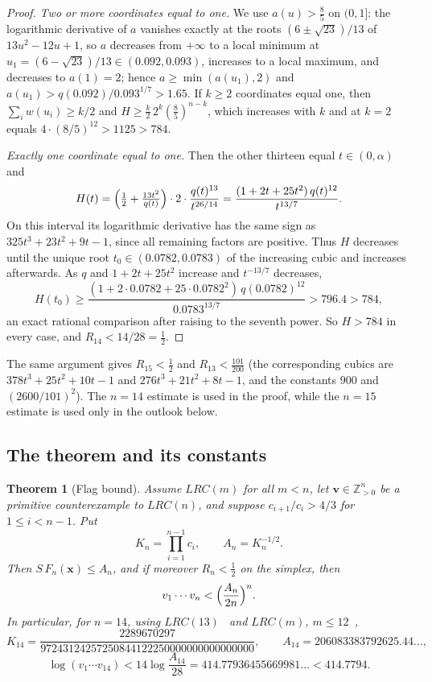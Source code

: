 \documentclass[11pt]{article}
\newtheorem{theorem}{Theorem}[section]
\theoremstyle{definition}
\theoremstyle{remark}
\newcommand{\Z}{\mathbb{Z}}
\newcommand{\vct}[1]{\mathbf{#1}}
\newcommand{\RawThreshUB}{414.7794}       %
\begin{document}
\begin{proof}
\emph{Two or more coordinates equal to one.}  We use $a(u)>\frac85$ on
$(0,1]$: the logarithmic derivative of $a$ vanishes exactly at the roots
$(6\pm\sqrt{23})/13$ of $13u^2-12u+1$, so $a$ decreases from $+\infty$
to a local minimum at $u_1=(6-\sqrt{23})/13\in(0.092,0.093)$, increases
to a local maximum, and decreases to $a(1)=2$; hence
$a\geq\min(a(u_1),2)$ and $a(u_1)>q(0.092)/0.093^{1/7}>1.65$.  If $k\geq2$
coordinates equal one, then $\sum_iw(u_i)\geq k/2$ and
$H\geq\frac k2\,2^k(\tfrac85)^{n-k}$, which increases with $k$ and at
$k=2$ equals $4\cdot(8/5)^{12}>1125>784$.

\emph{Exactly one coordinate equal to one.}  Then the other thirteen equal
$t\in(0,\alpha)$ and
\[
  H(t)=\Bigl(\tfrac12+\tfrac{13t^2}{q(t)}\Bigr)\cdot2\cdot\frac{q(t)^{13}}{t^{26/14}}
  =\frac{(1+2t+25t^2)\,q(t)^{12}}{t^{13/7}} .
\]
On this interval its logarithmic derivative has the same sign as
$325t^3+23t^2+9t-1$, since all remaining factors are positive.  Thus $H$
decreases until the unique root
$t_0\in(0.0782,0.0783)$ of the increasing cubic and increases afterwards.
As $q$ and $1+2t+25t^2$ increase and $t^{-13/7}$ decreases,
\[
  H(t_0)\geq\frac{(1+2\cdot0.0782+25\cdot0.0782^2)\,q(0.0782)^{12}}{0.0783^{13/7}}
  >796.4>784 ,
\]
an exact rational comparison after raising to the seventh power.  So
$H>784$ in every case, and $R_{14}<14/28=\frac12$.
\end{proof}

The same argument gives $R_{15}<\frac12$ and $R_{13}<\frac{101}{200}$
(the corresponding cubics are $378t^3+25t^2+10t-1$ and
$276t^3+21t^2+8t-1$, and the constants $900$ and $(2600/101)^2$).  The
$n=14$ estimate is used in the proof, while the $n=15$ estimate is used
only in the outlook below.

\subsection{The theorem and its constants}

\begin{theorem}[Flag bound]\label{thm:flag}
Assume $LRC(m)$ for all $m<n$, let $\vct{v}\in\Z^n_{>0}$ be a primitive
counterexample to $LRC(n)$, and suppose $c_{i+1}/c_i>4/3$ for
$1\leq i<n-1$.  Put
\[
  K_n=\prod_{i=1}^{n-1}c_i,\qquad A_n=K_n^{-1/2}.
\]
Then $S\,F_n(\vct{x})\leq A_n$, and if moreover $R_n<\frac12$ on the
simplex, then
\[
  v_1\cdots v_n<\Bigl(\frac{A_n}{2n}\Bigr)^{n}.
\]
In particular, for $n=14$, using $LRC(13)$~\cite{Allikvere26} and
$LRC(m)$, $m\leq12$~\cite{ST26},
\[
  K_{14}=\frac{2289670297}{97243124257250844122250000000000000000},\qquad
  A_{14}=206083383792625.44\ldots,
\]
\[
  \log(v_1\cdots v_{14})<14\log\frac{A_{14}}{28}
  =414.77936455669981\ldots<\RawThreshUB .
\]
\end{theorem}
\end{document}
